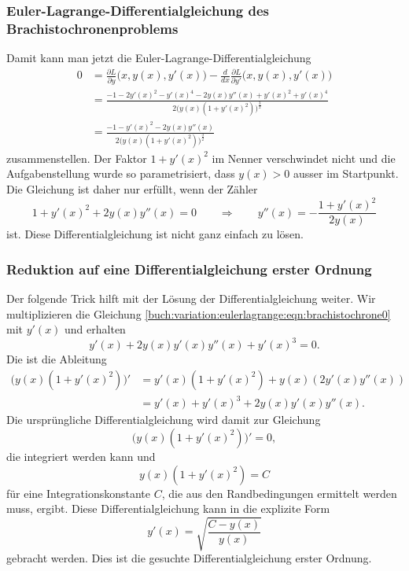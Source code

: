 \subsubsection{Euler-Lagrange-Differentialgleichung des
Brachistochronenproblems}
Damit kann man jetzt die Euler-Lagrange-Differentialgleichung
\begin{align*}
0
&=
\frac{\partial L}{\partial y}\bigl(x,y(x),y'(x)\bigr)
-
\frac{d}{dx}
\frac{\partial L}{\partial y'}\bigl(x,y(x),y'(x)\bigr)
\\
&=
\frac{
-1 - 2y'(x)^2 - y'(x)^4
-2y(x)y''(x)+y'(x)^2+y'(x)^4
}{
2
\bigl(
y(x)
(1+y'(x)^2)
\bigr)^{\frac32}
}
\\
&=
\frac{
-1 - y'(x)^2
-2y(x)y''(x)
}{
2
\bigl(
y(x)
(1+y'(x)^2)
\bigr)^{\frac32}
}
\end{align*}
zusammenstellen.
Der Faktor $1+y'(x)^2$ im Nenner verschwindet nicht und die
Aufgabenstellung wurde so parametrisiert, dass $y(x)>0$ ausser
im Startpunkt.
Die Gleichung ist daher nur erfüllt, wenn der Zähler
\begin{equation}
1+y'(x)^2+2y(x)y''(x)=0
\qquad\Rightarrow\qquad
y''(x)
=
-\frac{1+y'(x)^2}{2y(x)}
\label{buch:variation:eulerlagrange:eqn:brachistochrone0}
\end{equation}
ist.
Diese Differentialgleichung ist nicht ganz einfach zu lösen.

%
%
\subsubsection{Reduktion auf eine Differentialgleichung erster Ordnung}
Der folgende Trick hilft mit der Lösung der Differentialgleichung weiter.
Wir multiplizieren die Gleichung
\eqref{buch:variation:eulerlagrange:eqn:brachistochrone0}
mit $y'(x)$ und erhalten
\begin{equation}
y'(x) + 2y(x)y'(x)y''(x) + y'(x)^3 = 0.
\label{buch:variation:eulerlagrange:eqn:multiplikation}
\end{equation}
Die ist die Ableitung
\begin{align*}
\bigl(
y(x)(1+y'(x)^2)
\bigr)'
&=
y'(x)(1+y'(x)^2)
+
y(x)(2y'(x)y''(x))
\\
&=
y'(x) + y'(x)^3
+2y(x)y'(x)y''(x).
\end{align*}
Die ursprüngliche Differentialgleichung wird damit zur Gleichung
\[
\bigl(
y(x)(1+y'(x)^2)
\bigr)'
=
0,
\]
die integriert werden kann und
\[
y(x)(1+y'(x)^2)
=
C
\]
für eine Integrationskonstante $C$, die aus den Randbedingungen
ermittelt werden muss, ergibt.
Diese Differentialgleichung kann in die explizite Form
\begin{equation}
y'(x)
=
\sqrt{
\frac{C-y(x)}{y(x)}
}
\label{buch:variation:eulerlagrange:eqn:brachistochrone1}
\end{equation}
gebracht werden.
Dies ist die gesuchte Differentialgleichung erster Ordnung.

